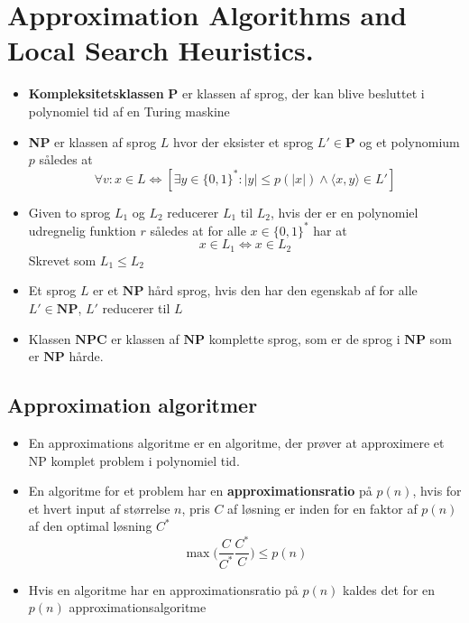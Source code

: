 \section{Approximation Algorithms and Local Search Heuristics.}
\begin{itemize}
	\item \textbf{Kompleksitetsklassen} $\mathbf P$ er klassen af sprog, der kan blive besluttet i polynomiel tid af en Turing maskine
	\item \textbf{NP} er klassen af sprog $L$ hvor der eksister et sprog $L' \in \mathbf P$ og et polynomium $p$ således at
  \begin{equation*}
    \forall v: x \in L \Leftrightarrow [\exists y \in \{0,1\}^* : |y| \leq p(|x|) \land \langle x, y \rangle \in L']
  \end{equation*}
  \item Given to sprog $L_1$ og $L_2$ reducerer $L_1$ til $L_2$, hvis der er en polynomiel udregnelig funktion $r$ således at for alle $x \in \{0,1\}^*$ har at
  \begin{equation*}
    x \in L_1 \Leftrightarrow x \in L_2
  \end{equation*}
  Skrevet som $L_1 \leq L_2$ 
  \item Et sprog $L$ er et $\mathbf{NP}$ hård sprog, hvis den har den egenskab af for alle $L' \in \mathbf{NP}$, $L'$ reducerer til $L$ 
  \item Klassen $\mathbf{NPC}$ er klassen af $\mathbf{NP}$ komplette sprog, som er de sprog i $\mathbf{NP}$ som er $\mathbf{NP}$ hårde.
\end{itemize}

\subsection{Approximation algoritmer}
\begin{itemize}
	\item En approximations algoritme er en algoritme, der prøver at approximere et NP komplet problem i polynomiel tid.
  \item En algoritme for et problem har en \textbf{approximationsratio} på $p(n)$, hvis for et hvert input af størrelse $n$, pris $C$ af løsning er inden for en faktor af $p(n)$ af den optimal løsning $C^*$ 
  \begin{equation*}
    \max\bigg(\frac C{C^*} \frac{C^*}{C} \bigg) \leq p(n)
  \end{equation*}
  \item Hvis en algoritme har en approximationsratio på $p(n)$ kaldes det for en $p(n)$ approximationsalgoritme
\end{itemize}

